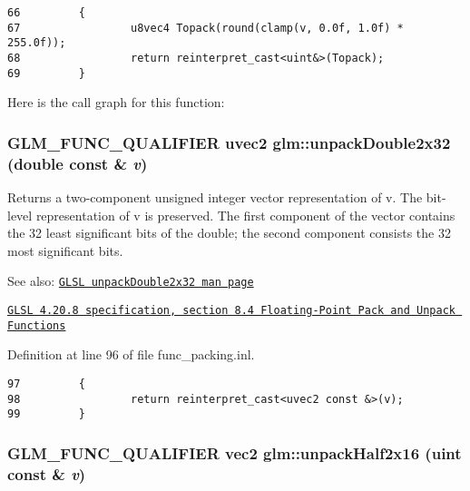 \begin{Code}\begin{verbatim}66         {
67                 u8vec4 Topack(round(clamp(v, 0.0f, 1.0f) * 255.0f));
68                 return reinterpret_cast<uint&>(Topack);
69         }
\end{verbatim}
\end{Code}




Here is the call graph for this function:\hypertarget{group__core__func__packing_g7e8cf88c278c18969c99af83bceed024}{
\subsubsection[unpackDouble2x32]{\setlength{\rightskip}{0pt plus 5cm}GLM\_\-FUNC\_\-QUALIFIER uvec2 glm::unpackDouble2x32 (double const \& {\em v})}}
\label{group__core__func__packing_g7e8cf88c278c18969c99af83bceed024}


Returns a two-component unsigned integer vector representation of v. The bit-level representation of v is preserved. The first component of the vector contains the 32 least significant bits of the double; the second component consists the 32 most significant bits.

\begin{Desc}
\item[See also:]\href{http://www.opengl.org/sdk/docs/manglsl/xhtml/unpackDouble2x32.xml}{\tt GLSL unpackDouble2x32 man page} 

\href{http://www.opengl.org/registry/doc/GLSLangSpec.4.20.8.pdf}{\tt GLSL 4.20.8 specification, section 8.4 Floating-Point Pack and Unpack Functions} \end{Desc}


Definition at line 96 of file func\_\-packing.inl.

\begin{Code}\begin{verbatim}97         {
98                 return reinterpret_cast<uvec2 const &>(v);
99         }
\end{verbatim}
\end{Code}


\hypertarget{group__core__func__packing_g4051804cc2c930ba4ca73382b79edf1d}{
\subsubsection[unpackHalf2x16]{\setlength{\rightskip}{0pt plus 5cm}GLM\_\-FUNC\_\-QUALIFIER vec2 glm::unpackHalf2x16 (uint const \& {\em v})}}
\label{group__core__func__packing_g4051804cc2c930ba4ca73382b79edf1d}


